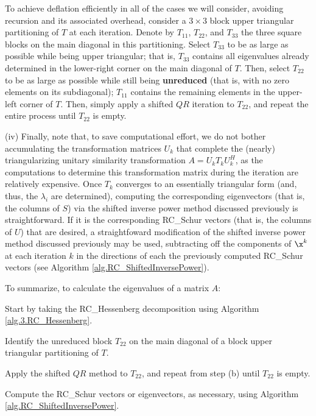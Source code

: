 To achieve deflation efficiently in all of the cases we will consider, avoiding recursion and its associated overhead,
consider a $3\times 3$ block upper triangular partitioning of $T$ at each iteration.
Denote by $T_{11}$, $T_{22}$, and $T_{33}$ the three square blocks on the main diagonal in
this partitioning.  Select $T_{33}$ to be as large as possible
while being upper triangular; that is, $T_{33}$ contains all eigenvalues already determined
in the lower-right corner on the main diagonal of $T$.  Then, select $T_{22}$
to be as large as possible while still being {\bf unreduced} (that is, with
no zero elements on its subdiagonal); $T_{11}$ contains the remaining elements in the upper-left corner of $T$.
Then, simply apply a shifted $QR$ iteration to $T_{22}$, and repeat the entire process until $T_{22}$ is empty.\label{par:T22isolation}\vskip0.1in

\noindent (iv)
Finally, note that, to save computational effort, we do not bother accumulating the transformation matrices $U_k$ that
complete the (nearly) triangularizing unitary similarity transformation $A=U_k T_k U_k^H$, as the computations to determine this transformation matrix
during the iteration are relatively expensive.  
Once $T_k$ converges to an essentially triangular form (and, thus, the $\lambda_i$ are determined), computing the corresponding eigenvectors (that is, the columns of $S$) via the shifted inverse power method discussed previously is straightforward.
If it is the corresponding RC_Schur vectors (that is, the columns of $U$) that are desired, a straightfoward modification of the shifted inverse power method discussed previously may be used,
subtracting off the components of $\x^{k}$ at each iteration $k$ in the directions of each the previously computed RC_Schur vectors (see Algorithm \ref{alg.RC_ShiftedInversePower}). \vskip0.08in

\noindent To summarize, to calculate the eigenvalues of a matrix $A$:
\beginmylistb
\item[(a)] Start by taking the RC_Hessenberg decomposition using Algorithm \ref{alg.3.RC_Hessenberg}.
\item[(b)] Identify the unreduced block $T_{22}$ on the main diagonal of a block upper triangular partitioning of $T$.
\item[(c)] Apply the shifted $QR$ method to $T_{22}$, and repeat from step (b) until $T_{22}$ is empty. 
\item[(d)] Compute the RC_Schur vectors or eigenvectors, as necessary, using Algorithm \ref{alg.RC_ShiftedInversePower}.
\endmylist \vskip0.08in

